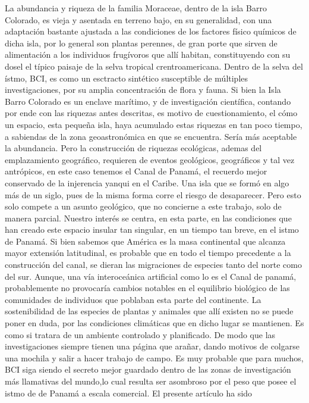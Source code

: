 \documentclass[11pt,]{article}
\begin{document}
La abundancia y riqueza de la familia Moraceae, dentro de la isla Barro
Colorado, es vieja y asentada en terreno bajo, en su generalidad, con
una adaptación bastante ajustada a las condiciones de los factores
físico químicos de dicha isla, por lo general son plantas perennes, de
gran porte que sirven de alimentación a los individuos frugívoros que
allí habitan, constituyendo con su dosel el típico paisaje de la selva
tropical crentroamericana. Dentro de la selva del ístmo, BCI, es como un
esctracto sintético susceptible de múltiples investigaciones, por su
amplia concentración de flora y fauna. Si bien la Isla Barro Colorado es
un enclave marítimo, y de investigación científica, contando por ende
con las riquezas antes descritas, es motivo de cuestionamiento, el cómo
un espacio, esta pequeña isla, haya acumulado estas riquezas en tan poco
tiempo, a sabiendas de la zona geoastronómica en que se encuentra. Sería
más aceptable la abundancia. Pero la construcción de riquezas
ecológicas, ademas del emplazamiento geográfico, requieren de eventos
geológicos, geográficos y tal vez antrópicos, en este caso tenemos el
Canal de Panamá, el recuerdo mejor conservado de la injerencia yanqui en
el Caribe. Una isla que se formó en algo más de un siglo, pues de la
misma forma corre el riesgo de desaparecer. Pero esto solo compete a un
asunto geológico, que no concierne a este trabajo, solo de manera
parcial. Nuestro interés se centra, en esta parte, en las condiciones
que han creado este espacio insular tan singular, en un tiempo tan
breve, en el istmo de Panamá. Si bien sabemos que América es la masa
continental que alcanza mayor extensión latitudinal, es probable que en
todo el tiempo precedente a la construcción del canal, se dieran las
migraciones de especies tanto del norte como del sur. Aunque, una vía
interoceánica artificial como lo es el Canal de panamá, probablemente no
provocaría cambios notables en el equilibrio biológico de las
comunidades de individuos que poblaban esta parte del continente. La
sostenibilidad de las especies de plantas y animales que allí existen no
se puede poner en duda, por las condiciones climáticas que en dicho
lugar se mantienen. Es como si tratara de un ambiente controlado y
planificado. De modo que las investigaciones siempre tienen una página
que arañar, dando motivos de colgarse una mochila y salir a hacer
trabajo de campo. Es muy probable que para muchos, BCI siga siendo el
secreto mejor guardado dentro de las zonas de investigación más
llamativas del mundo,lo cual resulta ser asombroso por el peso que posee
el istmo de de Panamá a escala comercial. El presente artículo ha sido
\end{document}
